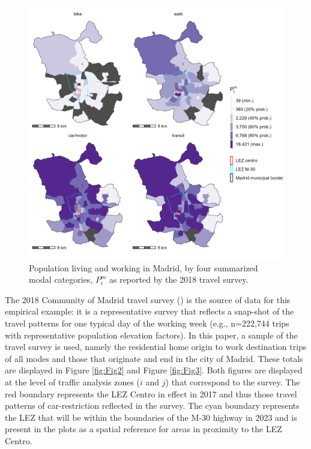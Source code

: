 \documentclass[]{trbunofficial}
\begin{document}
\begin{figure}

{\centering \includegraphics[width=1\linewidth]{images/im_populations_zn208_plot} 

}

\caption{\label{fig:Fig3} Population living and working in Madrid, by four summarized modal categories, $P^m_i$ as reported by the 2018 travel survey.}\label{fig:pop-plot}
\end{figure}

The 2018 Community of Madrid travel survey
(\citet{comunidaddemadridResultadosEDM20182020}) is the source of data
for this empirical example: it is a representative survey that reflects
a snap-shot of the travel patterns for one typical day of the working
week (e.g., n=222,744 trips with representative population elevation
factors). In this paper, a sample of the travel survey is used, namely
the residential home origin to work destination trips of all modes and
those that originate and end in the city of Madrid. These totals are
displayed in Figure \ref{fig:Fig2} and Figure \ref{fig:Fig3}. Both
figures are displayed at the level of traffic analysis zones (\(i\) and
\(j\)) that correspond to the survey. The red boundary represents the
LEZ Centro in effect in 2017 and thus those travel patterns of
car-restriction reflected in the survey. The cyan boundary represents
the LEZ that will be within the boundaries of the M-30 highway in 2023
and is present in the plots as a spatial reference for areas in
proximity to the LEZ Centro.
\end{document}
